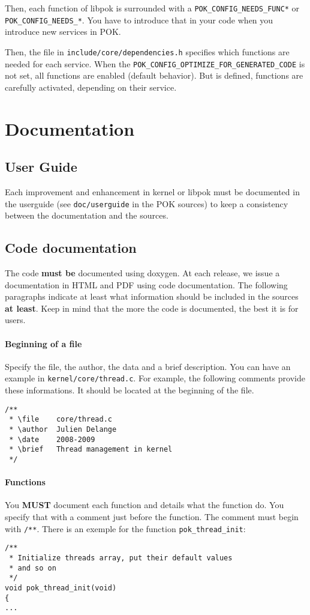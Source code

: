 \documentclass[oneside]{article}
\begin{document}
Then, each function of libpok is surrounded with a \texttt{POK\_CONFIG\_NEEDS\_FUNC*}
or \texttt{POK\_CONFIG\_NEEDS\_*}. {\LARGE You have to introduce that in your code when
you introduce new services in POK}.

Then, the file in \texttt{include/core/dependencies.h} specifies which functions
are needed for each service. When the
\texttt{POK\_CONFIG\_OPTIMIZE\_FOR\_GENERATED\_CODE} is not set, all functions
are enabled (default behavior). But is defined, functions are carefully
activated, depending on their service.


\section{Documentation}
   \subsection{User Guide}
   Each improvement and enhancement in kernel or libpok must be documented in the
   userguide (see \texttt{doc/userguide} in the POK sources) to keep a consistency
   between the documentation and the sources.

   \subsection{Code documentation}
   The code \textbf{must be} documented using doxygen. At each release, we issue
   a documentation in HTML and PDF using code documentation. The following
   paragraphs indicate at least what information should be included in the
   sources \textbf{at least}. Keep in mind that the more the code is documented,
   the best it is for users.

      \paragraph{Beginning of a file\\}
      Specify the file, the author, the data and a brief description. You can
      have an example in \texttt{kernel/core/thread.c}. For example, the
      following comments provide these informations. It should be located at the
      beginning of the file.
      \begin{verbatim}
/**
 * \file    core/thread.c
 * \author  Julien Delange
 * \date    2008-2009
 * \brief   Thread management in kernel
 */
      \end{verbatim}

      \paragraph{Functions\\}
      You \textbf{MUST} document each function and details what the function do.
      You specify that with a comment just before the function. The comment must
      begin with \texttt{/**}. There is an exemple for the function
      \texttt{pok\_thread\_init}:
      \begin{verbatim}
/**
 * Initialize threads array, put their default values
 * and so on
 */
void pok_thread_init(void)
{
...
      \end{verbatim}
\end{document}
